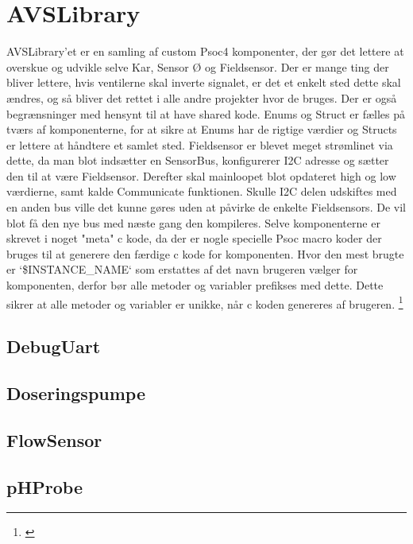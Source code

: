 \section{AVSLibrary}

AVSLibrary'et er en samling af custom Psoc4 komponenter, 
der gør det lettere at overskue og udvikle selve Kar, Sensor Ø og Fieldsensor. 
Der er mange ting der bliver lettere, hvis ventilerne skal inverte signalet, 
er det et enkelt sted dette skal ændres, og så bliver det rettet i alle andre 
projekter hvor de bruges. Der er også begrænsninger med hensynt til at have 
shared kode. Enums og Struct er fælles på tværs af komponenterne, for at 
sikre at Enums har de rigtige værdier og Structs er lettere at håndtere et 
samlet sted. Fieldsensor er blevet meget strømlinet via dette, da man 
blot indsætter en SensorBus, konfigurerer I2C adresse og sætter den til 
at være Fieldsensor. Derefter skal mainloopet blot opdateret high og low 
værdierne, samt kalde Communicate funktionen. Skulle I2C delen udskiftes 
med en anden bus ville det kunne gøres uden at påvirke de enkelte Fieldsensors. 
De vil blot få den nye bus med næste gang den kompileres.
Selve komponenterne er skrevet i noget "meta" c kode, da der er nogle 
specielle Psoc macro koder der bruges til at generere den færdige c kode 
for komponenten. Hvor den mest brugte er `\$INSTANCE\_NAME` som erstattes 
af det navn brugeren vælger for komponenten, derfor bør alle metoder og variabler 
prefikses med dette. Dette sikrer at alle metoder og variabler er unikke, når 
c koden genereres af brugeren. \footnote{\citet{cypress:psoc4author}}

\subsection{DebugUart}


\subsection{Doseringspumpe}


\subsection{FlowSensor}


\subsection{pHProbe}



